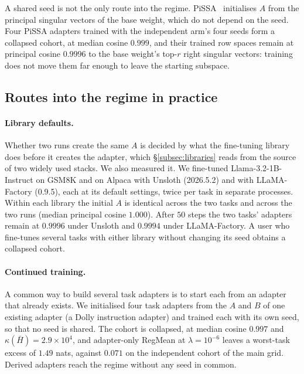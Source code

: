 A shared seed is not the only route into the regime. PiSSA~\citep{meng2024pissa}
initialises $A$ from the principal singular vectors of the base weight, which
do not depend on the seed. Four PiSSA adapters trained with the independent
arm's four seeds form a collapsed cohort, at median cosine $0.999$, and their
trained row spaces remain at principal cosine $0.9996$ to the base weight's
top-$r$ right singular vectors: training does not move them far enough to
leave the starting subspace.

\subsection{Routes into the regime in practice}\label{subsec:routes}

\paragraph{Library defaults.} Whether two runs create the same $A$ is decided
by what the fine-tuning library does before it creates the adapter, which
\S\ref{subsec:libraries} reads from the source of two widely used stacks. We also
measured it. We fine-tuned Llama-3.2-1B-Instruct on GSM8K and on Alpaca with
Unsloth (2026.5.2) and with LLaMA-Factory (0.9.5), each at its default
settings, twice per task in separate processes. Within each library the
initial $A$ is identical across the two tasks and across the two runs (median
principal cosine $1.000$). After $50$ steps the two tasks' adapters remain at
$0.9996$ under Unsloth and $0.9994$ under LLaMA-Factory. A user who fine-tunes
several tasks with either library without changing its seed obtains a
collapsed cohort.

\paragraph{Continued training.} A common way to build several task adapters is
to start each from an adapter that already exists. We initialised four task
adapters from the $A$ and $B$ of one existing adapter (a Dolly instruction
adapter) and trained each with its own seed, so that no seed is shared. The
cohort is collapsed, at median cosine $0.997$ and
$\kappa(\bar H) = 2.9\times10^{4}$, and adapter-only RegMean at
$\lambda = 10^{-6}$ leaves a worst-task excess of $1.49$ nats, against $0.071$
on the independent cohort of the main grid. Derived adapters reach the regime
without any seed in common.

